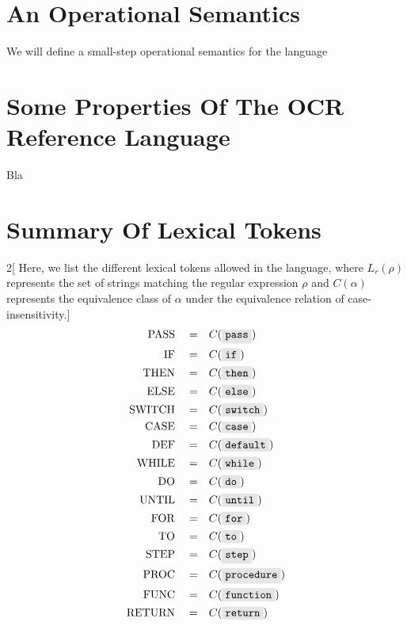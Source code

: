 \documentclass{article}
\newcommand{\code}[1]{\colorbox{gray!20}{\texttt{#1}}}
\begin{document}
\section{An Operational Semantics}
    We will define a small-step operational semantics for the language

\section{Some Properties Of The OCR Reference Language}
    Bla

\printbibliography
\newpage
\appendix
\section{Summary Of Lexical Tokens}
\begin{multicols}{2}[
Here, we list the different lexical tokens allowed in the language, where $L_r(\rho)$ represents the set of strings matching the regular expression $\rho$ and $C(\alpha)$ represents the equivalence class of $\alpha$ under the equivalence relation of case-insensitivity.]
\begin{align}
    \mathrm{PASS}\quad =&\quad C( \code{pass} ) \\
    \mathrm{IF}\quad =&\quad C( \code{if} ) \\
    \mathrm{THEN}\quad =&\quad C( \code{then} ) \\
    \mathrm{ELSE}\quad =&\quad C( \code{else} ) \\
    \mathrm{SWITCH}\quad =&\quad C( \code{switch} ) \\
    \mathrm{CASE}\quad =&\quad C( \code{case} ) \\
    \mathrm{DEF}\quad =&\quad C( \code{default} ) \\
    \mathrm{WHILE}\quad =&\quad C( \code{while} ) \\
    \mathrm{DO}\quad =&\quad C( \code{do} ) \\
    \mathrm{UNTIL}\quad =&\quad C( \code{until} ) \\
    \mathrm{FOR}\quad =&\quad C( \code{for} ) \\
    \mathrm{TO}\quad =&\quad C( \code{to} ) \\
    \mathrm{STEP}\quad =&\quad C( \code{step} ) \\
    \mathrm{PROC}\quad =&\quad C( \code{procedure} ) \\
    \mathrm{FUNC}\quad =&\quad C( \code{function} ) \\
    \mathrm{RETURN}\quad =&\quad C( \code{return} ) \\

\end{align}
\end{multicols}
\end{document}
